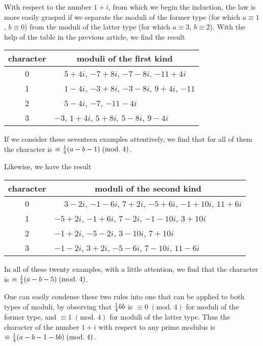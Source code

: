 \documentclass[twoside,12pt]{memoir}
\renewcommand{\pmod}[1]{\;(\textrm{mod.}\;#1)}
\let\oldfrac\frac
\def\frac#1#2{\mathchoice{\tfrac{#1}{#2}}{\oldfrac{#1}{#2}}{\genfrac{}{}{}{2}{#1}{#2\mathstrut}}{\genfrac{}{}{}{3}{#1}{#2\mathstrut}}}
\begin{document}
With respect to the number \(1+i\), from which we begin the induction, the law is more easily grasped if we separate the moduli of the former type (for which \(a \equiv 1\), \(b \equiv 0\)) from the moduli of the latter type (for which \(a \equiv 3\), \(b \equiv 2\)). With the help of the table in the previous article, we find the result\pagebreak%
\begin{center}
\begin{tabular}{c|l}
character & \multicolumn{1}{c}{moduli of the first kind} \\
\hline
0 & \(\phantom{+}5+4 i\), \(-7+8 i\), \(-7-8 i\), \(-11+4 i\) \\
1 & \(\phantom{+}1-4 i\), \(-3+8 i\), \(-3-8 i\), \(9+4i\), \(-11\) \\
2 & \(\phantom{+}5-4 i\), \(-7\), \(-11-4 i\) \\
3 & \(-3\), \(1+4 i\), \(5+8 i\), \(5-8 i\), \(9-4 i\) \\
\end{tabular}
\end{center}
If we consider these seventeen examples attentively, we find that for all of them the character is \(\equiv \frac{1}{4}(a-b-1)\pmod{4}\).

Likewise, we have the result
\begin{center}
\begin{tabular}{c|l}
character & \multicolumn{1}{c}{moduli of the second kind} \\
\hline
0 & \(\phantom{+}3-2 i\), \(-1-6 i\), \(7+2 i\), \(-5+6 i\), \(-1+10 i\), \(11+6 i\) \\
1 & \(-5+2 i\), \(-1+6 i\), \(7-2 i\), \(-1-10 i\), \(3+10 i\) \\
2 & \(-1+2 i\), \(-5-2 i\), \(3-10 i\), \(7+10 i\) \\
3 & \(-1-2 i\), \(3+2 i\), \(-5-6 i\), \(7-10 i\), \(11-6 i\) \\
\end{tabular}
\end{center}
In all of these twenty examples, with a little attention, we find that the character is \(\equiv \frac{1}{4}(a-b-5)\pmod{4}\).

One can easily condense these two rules into one that can be applied to both types of moduli, by observing that \(\frac{1}{4} b b\) is \(\equiv 0\pmod{4}\) for moduli of the former type, and \(\equiv 1\pmod{4}\) for moduli of the latter type. Thus the character of the number \(1+i\) with respect to any prime modulus is \(\equiv \frac{1}{4}(a-b-1-b b)\pmod{4}\).
\end{document}
